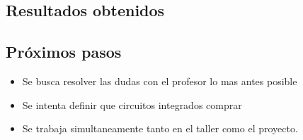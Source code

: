 \documentclass[12pt,letterpaper]{article}
\begin{document}
\subsection*{Resultados obtenidos}

\subsection*{Próximos pasos}
\begin{itemize}
    \item Se busca resolver las dudas con el profesor lo mas antes posible
	\item Se intenta definir que circuitos integrados comprar
	\item Se trabaja simultaneamente tanto en el taller como el proyecto.
\end{itemize}



\printbibliography
\end{document}
